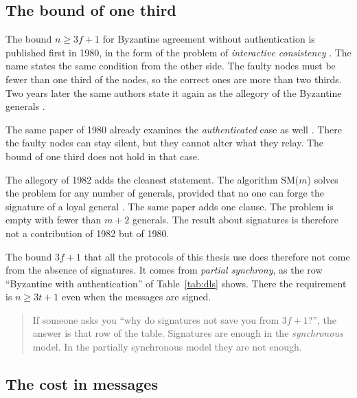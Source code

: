 \subsection{The bound of one third}

The bound $n \ge 3f+1$ for Byzantine agreement without authentication is
published first in 1980, in the form of the problem of \emph{interactive
consistency} \cite{pease1980reaching}. The name states the same
condition from the other side. The faulty nodes must be fewer than one
third of the nodes, so the correct ones are more than two thirds. Two
years later the same authors state it again as the allegory of the
Byzantine generals \cite{lamport1982byzantine}.

The same paper of 1980 already examines the \emph{authenticated} case as
well \cite{pease1980reaching}. There the faulty nodes can stay silent,
but they cannot alter what they relay. The bound of one third does not
hold in that case.

The allegory of 1982 adds the cleanest statement. The algorithm SM($m$)
solves the problem for any number of generals, provided that no one can
forge the signature of a loyal general \cite{lamport1982byzantine}. The
same paper adds one clause. The problem is empty with fewer than
$m{+}2$ generals. The result about signatures is therefore not a
contribution of 1982 but of 1980.

The bound $3f{+}1$ that all the protocols of this thesis use does
therefore not come from the absence of signatures. It comes from
\emph{partial synchrony}, as the row \enquote{Byzantine with
authentication} of Table~\ref{tab:dls} shows. There the requirement is
$n \ge 3t{+}1$ even when the messages are signed.

\begin{quote}\small
If someone asks you \enquote{why do signatures not save you from
$3f{+}1$?}, the answer is that row of the table. Signatures are enough
in the \emph{synchronous} model. In the partially synchronous model they
are not enough.
\end{quote}

\subsection{The cost in messages}

